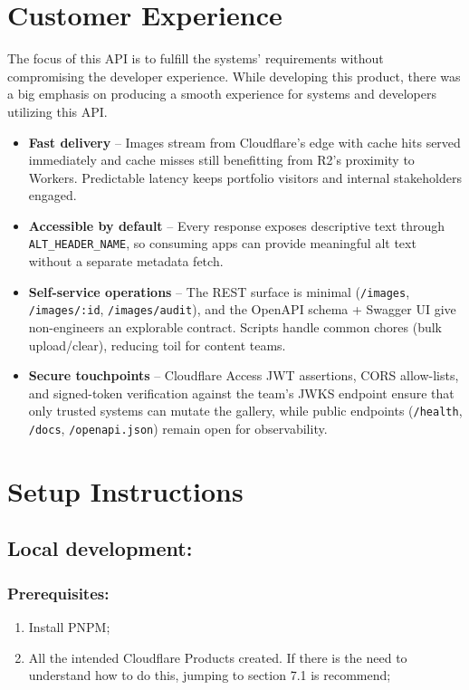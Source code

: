 \documentclass[12pt]{article}
\begin{document}
\section{Customer Experience}
The focus of this API is to fulfill the systems' requirements without compromising the developer experience. While developing this product, there was a big emphasis on producing a smooth experience for systems and developers utilizing this API.
\begin{itemize}[leftmargin=*]
  \item \textbf{Fast delivery} – Images stream from Cloudflare’s edge with cache hits served immediately and cache misses still benefitting from R2’s proximity to Workers. Predictable latency keeps portfolio visitors and internal stakeholders engaged.
  \item \textbf{Accessible by default} – Every response exposes descriptive text through \texttt{ALT\_HEADER\_NAME}, so consuming apps can provide meaningful alt text without a separate metadata fetch.
  \item \textbf{Self-service operations} – The REST surface is minimal (\texttt{/images}, \texttt{/images/:id}, \texttt{/images/audit}), and the OpenAPI schema + Swagger UI give non-engineers an explorable contract. Scripts handle common chores (bulk upload/clear), reducing toil for content teams.
  \item \textbf{Secure touchpoints} – Cloudflare Access JWT assertions, CORS allow-lists, and signed-token verification against the team's JWKS endpoint ensure that only trusted systems can mutate the gallery, while public endpoints (\texttt{/health}, \texttt{/docs}, \texttt{/openapi.json}) remain open for observability.
\end{itemize}

\section*{Setup Instructions}
\subsection{Local development:}

\subsubsection{Prerequisites:}
\begin{enumerate}[leftmargin=*]
  \item Install PNPM;
  \item All the intended Cloudflare Products created. If there is the need to understand how to do this, jumping to section 7.1 is recommend;
\end{enumerate}
\end{document}
